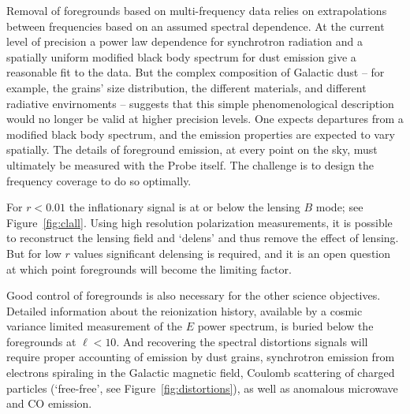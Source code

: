 Removal of foregrounds based on multi-frequency data relies on extrapolations 
between frequencies based on an assumed spectral dependence. At the current level of precision a power law 
dependence for synchrotron radiation and a spatially uniform modified black body spectrum for dust emission 
give a reasonable fit to the data. But the complex composition of Galactic dust -- for example, the grains' size distribution, 
the different materials, and different radiative envirnoments -- suggests that this simple phenomenological description 
would no longer be valid at higher precision levels. One expects departures from a modified black 
body spectrum, and the emission properties are expected to vary spatially. 
The details of foreground emission, at every point on the sky, must 
ultimately be measured with the Probe itself. The challenge is to design the frequency 
coverage to do so optimally.  

For $r<0.01$ the inflationary signal is at or below the lensing $B$ mode; see Figure~\ref{fig:clall}. 
Using high resolution polarization measurements, it is possible to reconstruct the lensing field and 
`delens' and thus remove the effect of lensing. But for low $r$ values significant delensing is 
required, and it is an open question at which point foregrounds will become the limiting factor. 

Good control of foregrounds is also necessary for the other science objectives. Detailed information 
about the reionization history, available by a cosmic variance limited measurement of the $E$ power spectrum, 
is buried below the foregrounds at $\ell < 10$. And 
recovering the spectral distortions signals will require proper accounting  of 
emission by dust grains, synchrotron emission from electrons spiraling in the Galactic magnetic 
field, Coulomb scattering of charged particles (`free-free', see Figure~\ref{fig:distortions}), 
as well as anomalous microwave and CO emission.   



